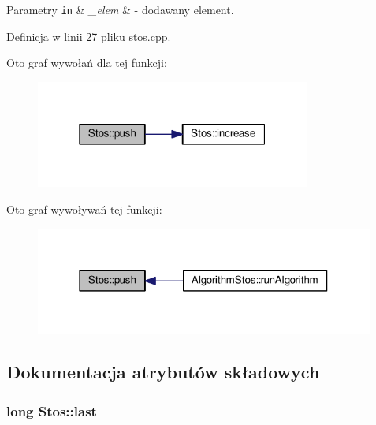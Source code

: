 \begin{DoxyParams}[1]{Parametry}
\mbox{\tt in}  & {\em \-\_\-elem} & -\/ dodawany element. \\
\hline
\end{DoxyParams}


Definicja w linii 27 pliku stos.\-cpp.



Oto graf wywołań dla tej funkcji\-:\nopagebreak
\begin{figure}[H]
\begin{center}
\leavevmode
\includegraphics[width=256pt]{class_stos_afd5802e405946328cccca3eed676b493_cgraph}
\end{center}
\end{figure}




Oto graf wywoływań tej funkcji\-:\nopagebreak
\begin{figure}[H]
\begin{center}
\leavevmode
\includegraphics[width=316pt]{class_stos_afd5802e405946328cccca3eed676b493_icgraph}
\end{center}
\end{figure}




\subsection{Dokumentacja atrybutów składowych}
\hypertarget{class_stos_ae0623cdf9b6725e38da86b74972d61ba}{
\subsubsection[{last}]{\setlength{\rightskip}{0pt plus 5cm}long Stos\-::last\hspace{0.3cm}{\ttfamily [private]}}}\label{class_stos_ae0623cdf9b6725e38da86b74972d61ba}


